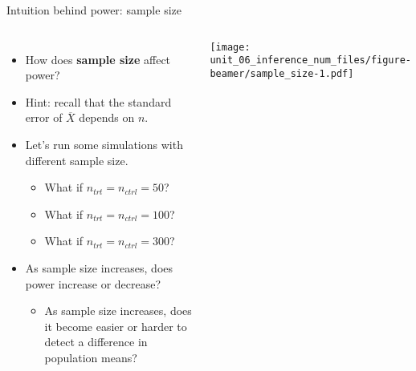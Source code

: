 \documentclass[
  ignorenonframetext,
  aspectratio=169]{beamer}
\newcommand{\columnsbegin}{\begin{columns}}
\newcommand{\columnsend}{\end{columns}}
\begin{document}
\begin{frame}{Intuition behind power: sample size}
\protect\hypertarget{intuition-behind-power-sample-size}{}
\columnsbegin


\footnotesize

\begin{itemize}
\item
  How does \textbf{sample size} affect power?
\item
  Hint: recall that the standard error of \(\overline{X}\) depends on
  \(n\).
\item
  Let's run some simulations with different sample size.

  \begin{itemize}

    \footnotesize

    \item What if $n_{trt} = n_{ctrl} = 50$?

    \item What if $n_{trt} = n_{ctrl} = 100$?

    \item What if $n_{trt} = n_{ctrl} = 300$?

    \end{itemize}
\item
  As sample size increases, does power increase or decrease?

  \begin{itemize}

    \footnotesize

    \item As sample size increases, does it become easier or harder to detect a difference in population means?

    \end{itemize}
\end{itemize}


\texttt{[image: unit\_06\_inference\_num\_files/figure-beamer/sample\_size-1.pdf]}

\columnsend
\end{frame}
\end{document}
